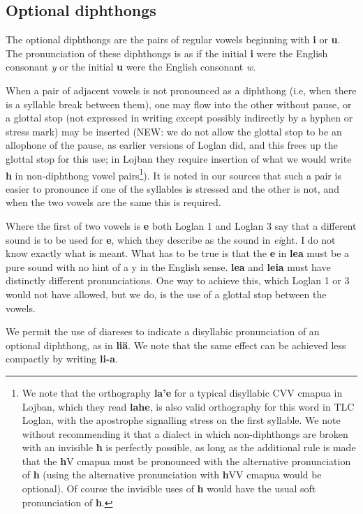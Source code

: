 \documentclass[12pt]{book}
\begin{document}
\subsection{Optional diphthongs}

The optional diphthongs are the pairs of regular vowels beginning with {\bf i} or {\bf u}.  The pronunciation of these diphthongs is as if the initial {\bf i} were the English consonant {\em y} or the initial {\bf u} were the English consonant {\em w}.   

When a pair of adjacent vowels is not pronounced as a diphthong (i.e, when there is a syllable break between them), one may flow into the other without pause, or a glottal stop (not expressed in writing except possibly indirectly by a hyphen or stress mark)  may be inserted (NEW:  we do not allow the glottal stop to be an allophone of the pause, as earlier versions of Loglan did, and this frees up the glottal stop for this use; in Lojban they require insertion of what we would write {\bf h} in non-diphthong vowel pairs\footnote{We note that the orthography {\bf la'e} for a typical disyllabic CVV cmapua in Lojban, which they read {\bf lahe}, is also valid orthography for this word in TLC Loglan, with the apostrophe signalling stress on the first syllable.  We note without recommending it that a dialect in which non-diphthongs are broken with an invisible {\bf h} is perfectly possible, as long as the additional rule is made that the {\bf h}V cmapua must be pronounced with the alternative pronunciation of {\bf h} (using the alternative pronunciation with {\bf h}VV cmapua would be optional).  Of course the invisible uses of {\bf h} would have the usual soft pronunciation of {\bf h}.}).  It is noted in our sources that such a pair is easier to pronounce if one of the syllables is stressed and the other is not, and when the two vowels are the same this is required.  

Where the first of two vowels is {\bf e} both Loglan 1 and Loglan 3 say that a different sound is to be used for {\bf e}, which they describe as the sound in {\em ei\/}ght.  I do not know exactly what is meant.  What has to be true is that the {\bf e} in {\bf lea} must be a pure sound with no hint of a y in the English sense.  {\bf lea} and {\bf leia} must have distinctly different pronunciations.  One way to achieve this, which Loglan 1 or 3 would not have allowed, but we do, is the use of a glottal stop between the vowels.

We permit the use of diareses to indicate a disyllabic pronunciation of an optional diphthong, as in {\bf li\"a}.  We note that the same effect can be achieved less compactly by writing {\bf li-a}.
\end{document}
